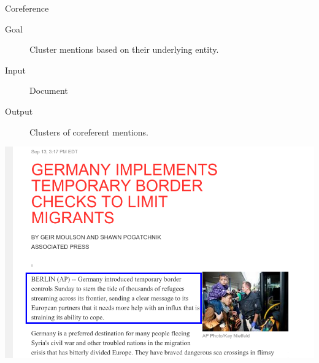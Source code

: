 \documentclass{beamer}
\begin{document}
\begin{frame}{Coreference}
  \begin{description}
  \item[Goal] Cluster mentions based on their underlying entity.
  \item[Input] Document
  \item[Output] Clusters of coreferent mentions.
  \end{description}  
\end{frame}


\begin{frame}
  \includegraphics[width=\linewidth]{ap}
\end{frame}


{

}
\end{document}
